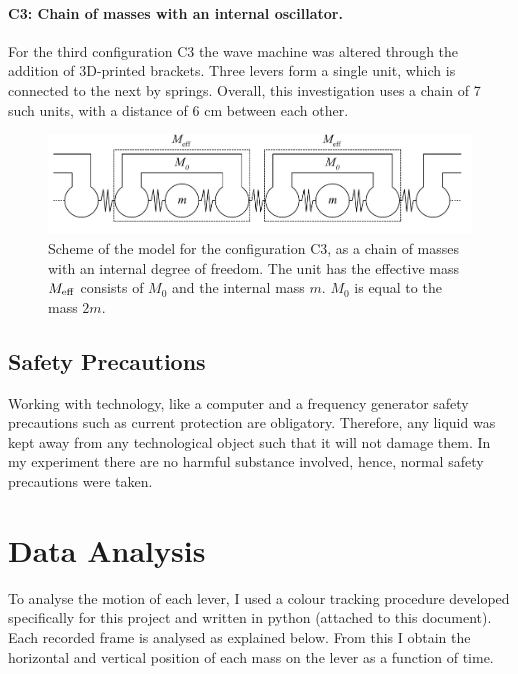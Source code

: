 \documentclass[12pt]{article}
\begin{document}
\paragraph{C3: Chain of masses with an internal oscillator.}For the third configuration C3 the wave machine was altered through the addition of 3D-printed brackets. Three levers form a single unit, which is connected to the next by springs. Overall, this investigation uses a chain of 7 such units, with a distance of 6 cm between each other.
\begin{figure}[hbt]	
  \includegraphics[width=.7\columnwidth]{condition2.pdf}
  \caption{Scheme of the model for the configuration C3, as a chain of masses with an internal degree of freedom. The unit has the effective mass $M_{\rm eff}$ consists of $M_0$ and the internal mass $m$. $M_0$ is equal to the mass $2m$.} \label{fig:figure8}
\end{figure}

\subsection{Safety Precautions}
Working with technology, like a computer and a frequency generator safety precautions such as current protection are obligatory. Therefore, any liquid was kept away from any technological object such that it will not damage them. In my experiment there are no harmful substance involved, hence, normal safety precautions were taken. 

\section{Data Analysis}\label{sec:section4}
To analyse the motion of each lever, I used a colour tracking procedure developed specifically for this project and written in python (attached to this document). Each recorded frame is analysed as explained below. From this I obtain the horizontal and vertical position of each mass on the lever as a function of time. 

\end{document}
